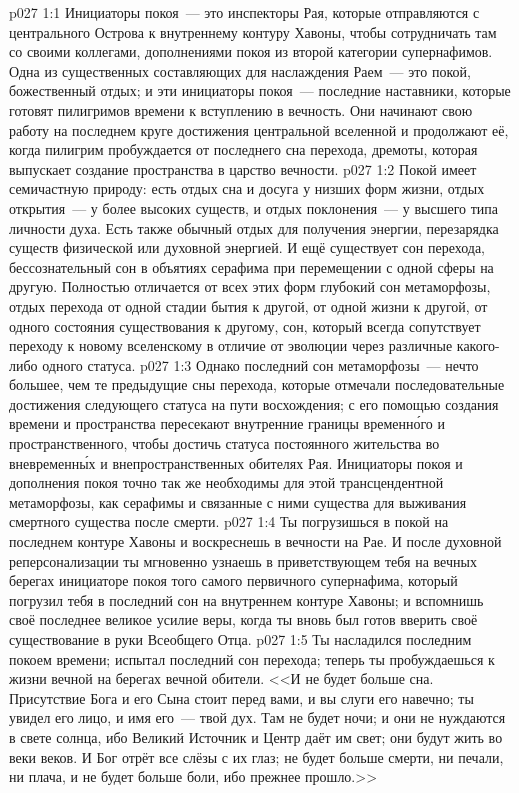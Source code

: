 \vs p027 1:1 Инициаторы покоя~--- это инспекторы Рая, которые отправляются с центрального Острова к внутреннему контуру Хавоны, чтобы сотрудничать там со своими коллегами, дополнениями покоя из второй категории супернафимов. Одна из существенных составляющих для наслаждения Раем~--- это покой, божественный отдых; и эти инициаторы покоя~--- последние наставники, которые готовят пилигримов времени к вступлению в вечность. Они начинают свою работу на последнем круге достижения центральной вселенной и продолжают её, когда пилигрим пробуждается от последнего сна перехода, дремоты, которая выпускает создание пространства в царство вечности.
\vs p027 1:2 \pc Покой имеет семичастную природу: есть отдых сна и досуга у низших форм жизни, отдых открытия~--- у более высоких существ, и отдых поклонения~--- у высшего типа личности духа. Есть также обычный отдых для получения энергии, перезарядка существ физической или духовной энергией. И ещё существует сон перехода, бессознательный сон в объятиях серафима при перемещении с одной сферы на другую. Полностью отличается от всех этих форм глубокий сон метаморфозы, отдых перехода от одной стадии бытия к другой, от одной жизни к другой, от одного состояния существования к другому, сон, который всегда сопутствует переходу к новому вселенскому  в отличие от эволюции через различные  какого\hyp{}либо одного статуса.
\vs p027 1:3 Однако последний сон метаморфозы~--- нечто большее, чем те предыдущие сны перехода, которые отмечали последовательные достижения следующего статуса на пути восхождения; с его помощью создания времени и пространства пересекают внутренние границы временн\'ого и пространственного, чтобы достичь статуса постоянного жительства во вневременн\'ых и внепространственных обителях Рая. Инициаторы покоя и дополнения покоя точно так же необходимы для этой трансцендентной метаморфозы, как серафимы и связанные с ними существа для выживания смертного существа после смерти.
\vs p027 1:4 \pc Ты погрузишься в покой на последнем контуре Хавоны и воскреснешь в вечности на Рае. И после духовной реперсонализации ты мгновенно узнаешь в приветствующем тебя на вечных берегах инициаторе покоя того самого первичного супернафима, который погрузил тебя в последний сон на внутреннем контуре Хавоны; и вспомнишь своё последнее великое усилие веры, когда ты вновь был готов вверить своё существование в руки Всеобщего Отца.
\vs p027 1:5 Ты насладился последним покоем времени; испытал последний сон перехода; теперь ты пробуждаешься к жизни вечной на берегах вечной обители. <<И не будет больше сна. Присутствие Бога и его Сына стоит перед вами, и вы слуги его навечно; ты увидел его лицо, и имя его~--- твой дух. Там не будет ночи; и они не нуждаются в свете солнца, ибо Великий Источник и Центр даёт им свет; они будут жить во веки веков. И Бог отрёт все слёзы с их глаз; не будет больше смерти, ни печали, ни плача, и не будет больше боли, ибо прежнее прошло.>>
